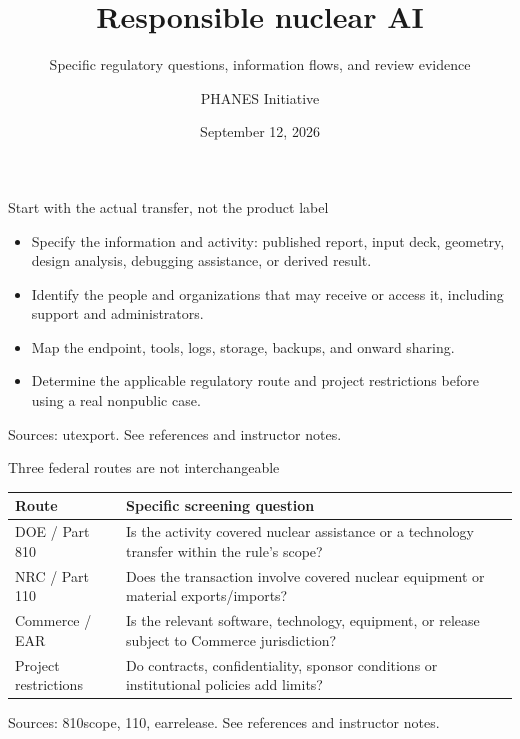 \documentclass[aspectratio=169,11pt]{beamer}
\title{Responsible nuclear AI}
\subtitle{Specific regulatory questions, information flows, and review evidence}
\author{PHANES Initiative}
\institute{The University of Texas at Austin}
\date{September 12, 2026}
\begin{document}
\begin{frame}[plain]
\titlepage
\end{frame}
\begin{frame}[t,fragile]{Start with the actual transfer, not the product label}
\fontsize{11.5}{14}\selectfont
\begin{itemize}\setlength{\itemsep}{2mm}
\item Specify the information and activity: published report, input deck, geometry, design analysis, debugging assistance, or derived result.
\item Identify the people and organizations that may receive or access it, including support and administrators.
\item Map the endpoint, tools, logs, storage, backups, and onward sharing.
\item Determine the applicable regulatory route and project restrictions before using a real nonpublic case.
\end{itemize}
\vfill{\fontsize{6.5}{8}\selectfont\color{UTgray} Sources: utexport. See references and instructor notes.\par}
\end{frame}
\begin{frame}[t,fragile]{Three federal routes are not interchangeable}
\fontsize{10.5}{12.5}\selectfont\setlength{\tabcolsep}{4pt}\renewcommand{\arraystretch}{1.15}
\begin{tabular}{>{\raggedright\arraybackslash}p{}>{\raggedright\arraybackslash}p{}}
\toprule
\textbf{Route} & \textbf{Specific screening question} \\ \midrule
DOE / Part 810 & Is the activity covered nuclear assistance or a technology transfer within the rule's scope? \\[2pt]
NRC / Part 110 & Does the transaction involve covered nuclear equipment or material exports/imports? \\[2pt]
Commerce / EAR & Is the relevant software, technology, equipment, or release subject to Commerce jurisdiction? \\[2pt]
Project restrictions & Do contracts, confidentiality, sponsor conditions or institutional policies add limits? \\[2pt]
\bottomrule\end{tabular}\par\vspace{2mm}
\vfill{\fontsize{6.5}{8}\selectfont\color{UTgray} Sources: 810scope, 110, earrelease. See references and instructor notes.\par}
\end{frame}
\end{document}
